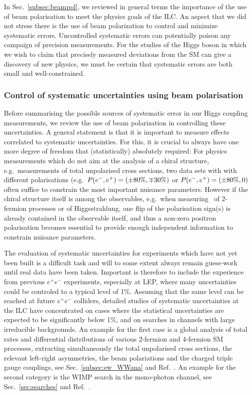 


In Sec.~\ref{subsec:beampol}, we reviewed in general terms the importance of the
 use of beam polarisation to meet the physics goals of the ILC.  An aspect that we did not stress there is the use of beam 
polarization to control and minimize systematic errors.  Uncontrolled systematic errors can potentially poison any campaign 
of precision measurements.   For the studies of the Higgs boson in which we wish to claim that precisely measured deviations from the SM can give a discovery of new physics, we must be certain that systematic errors are both small and well-constrained. 


\subsubsection{Control of systematic uncertainties using beam polarisation} 
\label{subsubsec:pol:systematics}

Before summarising the possible sources of systematic error in our Higgs coupling measurements, we review the use of beam polarization
in controlling these  uncertainties. A general statement is that it is important to measure effects correlated to systematic uncertainties.  For this, it is crucial to always have one more degree of freedom that (statistically) absolutely required: For physics measurements which do not aim at the analysis of a chiral structure, e.g.\ measurements of total unpolarised cross sections, two data sets with with different polarisations (e.g.\ $P(e^-,e^+)=(\pm 80\%, \mp 30\%)$ or $P(e^-,e^+)=(\pm 80\%, 0)$ often suffice to constrain the most important nuisance parameters. However if the chiral structure itself is among the observables, e.g.\ when measuring \ALR\ of 2-fermion processes or of Higgsstrahlung, one flip of the polarisation sign(s) is already contained in the observable itself, and thus a non-zero positron polarisation becomes essential to provide enough independent information to constrain nuisance parameters.

The evaluation of systematic uncertainties for experiments which have not yet been built is a difficult task and will to some extent always remain guess-work until real data have been taken. Important is therefore to include the experience from previous $e^+e^-$ experiments, especially at LEP, where many uncertainties could be controled to a typical level of 1\%. Assuming that the same level can be reached at future $e^+e^-$ colliders, detailed studies of systematic uncertainties at the ILC have concentrated on cases where the statistical uncertainties are expected to be significantly below 1\%, and on searches in channels with large irreducible backgrounds. An example for the first case is a global analysis of total rates and differential distributions of various 2-fermion and 4-fermion SM processes, extracting simultaneously the total unpolarised cross sections, the relevant left-right asymmetries, the beam polariations and the charged triple gauge couplings, see Sec.~\ref{subsec:ew_WWana} and Ref.~\cite{bib:PhDRobert}. An example for the second category is the WIMP search in the mono-photon channel, see Sec.~\ref{sec:searches} and Ref.~\cite{Habermehl:417605}. 

